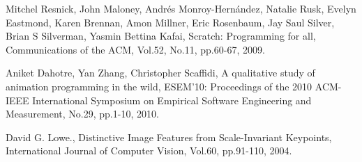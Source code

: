 \documentclass[twocolumn]{jarticle} %
\begin{document}


\begin{thebibliography}{9}	%
				
Mitchel Resnick, John Maloney, Andr\'{e}s Monroy-Hern\'{a}ndez, Natalie Rusk, Evelyn Eastmond, Karen Brennan, 
Amon Millner, Eric Rosenbaum, Jay Saul Silver, Brian S Silverman, Yasmin Bettina Kafai,
Scratch: Programming for all,
Communications of the ACM, Vol.52, No.11, pp.60-67, 2009.

Aniket Dahotre, Yan Zhang, Christopher Scaffidi,
A qualitative study of animation programming in the wild,
ESEM'10: Proceedings of the 2010 ACM-IEEE International Symposium on Empirical Software Engineering and Measurement,
No.29, pp.1-10, 2010.

David G. Lowe.,
Distinctive Image Features from Scale-Invariant Keypoints,
International Journal of Computer Vision, Vol.60, pp.91-110, 2004.

\end{thebibliography}

\end{document}

